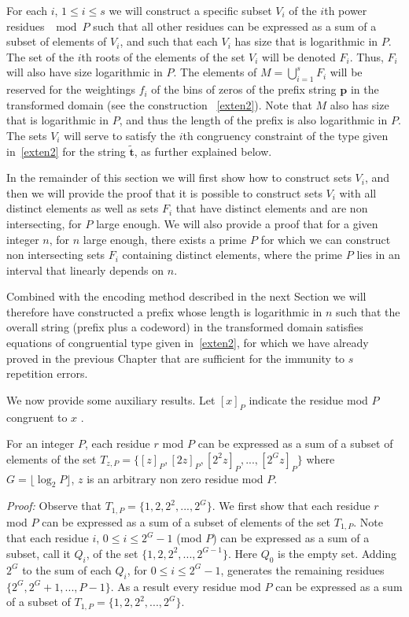 For each $i$, $1 \leq i \leq s$ we will construct a specific
subset $V_i$ of the $i$th power residues $\mod P$ such that all
other residues can be expressed as a sum of a subset  of elements
of $V_i$, and such that each $V_i$ has size that is logarithmic in
$P$. The set of the $i$th roots of the elements of the set $V_i$
will be denoted $F_i$. Thus, $F_i$ will also have size logarithmic
in $P$. The elements of $M =\bigcup_{i=1}^s F_i$ will be reserved
for the weightings $f_i$ of the bins of zeros of the prefix string
$\mathbf{p}$ in the transformed domain (see the construction
~\eqref{exten2}). Note that $M$ also has size that is logarithmic
in $P$, and thus the length of the prefix is also logarithmic in
$P$. The sets $V_i$ will serve to satisfy the $i$th congruency
constraint of the type given in~\eqref{exten2} for the string
$\mathbf{\tilde{t}}$, as further explained below.

In the remainder of this section we will first show how to
construct sets $V_i$, and then we will provide the proof that it
is possible to construct sets $V_i$ with all distinct elements as
well as  sets $F_i$ that have distinct elements and are non
intersecting, for $P$ large enough. We will also provide a proof
that for a given integer $n$, for $n$ large enough, there exists a
prime $P$ for which we can construct non intersecting sets $F_i$
containing distinct elements, where the prime $P$ lies in an
interval that linearly depends on $n$.

Combined with the encoding method described in the next Section we
will therefore have constructed a prefix whose length is
logarithmic in $n$ such that the overall string (prefix plus a
codeword) in the transformed domain satisfies equations of
congruential type given in~\eqref{exten2}, for which we have
already proved in the previous Chapter that are sufficient for the
immunity to $s$ repetition errors.



We now provide some auxiliary results. Let $[x]_P$ indicate the
residue mod $P$ congruent to $x$ .

\begin{lemma}\label{generates} For an integer $P$, each residue $r$ mod $P$ can be expressed as a
sum of a subset of elements of the set
$T_{z,P}=\{[z]_P,[2z]_P,[2^2z]_P,...,[2^{G}z]_P\}$ where
$G=\lfloor \log_2 P \rfloor $, $z$ is an arbitrary non zero
residue mod $P$.
\end{lemma}

\noindent \textit{Proof:} Observe that
$T_{1,P}=\{1,2,2^2,...,2^{G}\}$. We first show that each residue
$r$ mod $P$ can be expressed as a sum of a subset of elements of
the set $T_{1,P}$. Note that each residue $i$, $0 \leq i \leq
2^G-1$ (mod $P$) can be expressed as a sum of a subset, call it
$Q_i$, of the set $\{1,2,2^2,...,2^{G-1}\}$. Here $Q_0$ is the
empty set. Adding $2^G$ to the sum of each $Q_i$, for $0 \leq i
\leq 2^G-1$, generates the remaining residues $\{2^G,
2^G+1,...,P-1 \}$. As a result every residue mod $P$ can be
expressed as a sum of a subset of $T_{1,P}=\{1,2,2^2,...,2^{G}\}$.

